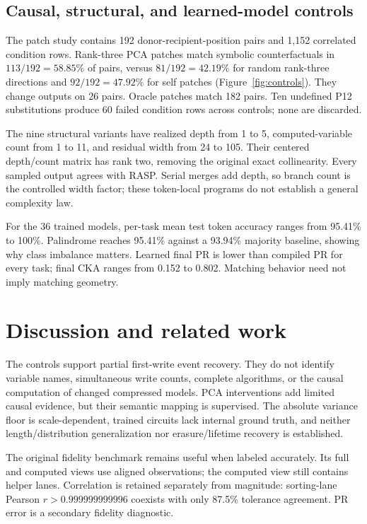 \documentclass[10pt,a4paper,twocolumn]{article}
\begin{document}
\subsection{Causal, structural, and learned-model controls}
The patch study contains 192 donor-recipient-position pairs and 1,152 correlated condition rows. Rank-three PCA patches match symbolic counterfactuals in $113/192=58.85\%$ of pairs, versus $81/192=42.19\%$ for random rank-three directions and $92/192=47.92\%$ for self patches (Figure~\ref{fig:controls}). They change outputs on 26 pairs. Oracle patches match 182 pairs. Ten undefined P12 substitutions produce 60 failed condition rows across controls; none are discarded.

The nine structural variants have realized depth from 1 to 5, computed-variable count from 1 to 11, and residual width from 24 to 105. Their centered depth/count matrix has rank two, removing the original exact collinearity. Every sampled output agrees with RASP. Serial merges add depth, so branch count is the controlled width factor; these token-local programs do not establish a general complexity law.

For the 36 trained models, per-task mean test token accuracy ranges from 95.41\% to 100\%. Palindrome reaches 95.41\% against a 93.94\% majority baseline, showing why class imbalance matters. Learned final PR is lower than compiled PR for every task; final CKA ranges from 0.152 to 0.802. Matching behavior need not imply matching geometry.

\balance
\section{Discussion and related work}
The controls support partial first-write event recovery. They do not identify variable names, simultaneous write counts, complete algorithms, or the causal computation of changed compressed models. PCA interventions add limited causal evidence, but their semantic mapping is supervised. The absolute variance floor is scale-dependent, trained circuits lack internal ground truth, and neither length/distribution generalization nor erasure/lifetime recovery is established.

The original fidelity benchmark remains useful when labeled accurately. Its full and computed views use aligned observations; the computed view still contains helper lanes. Correlation is retained separately from magnitude: sorting-lane Pearson $r>0.999999999996$ coexists with only 87.5\% tolerance agreement. PR error is a secondary fidelity diagnostic.
\end{document}
